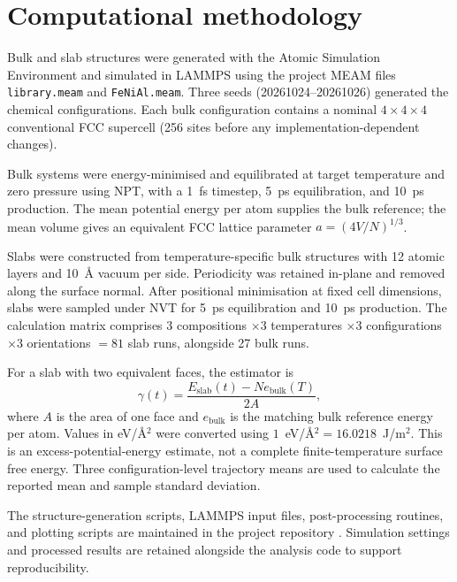 \section{Computational methodology}
Bulk and slab structures were generated with the Atomic Simulation Environment and simulated in LAMMPS using the project MEAM files \texttt{library.meam} and \texttt{FeNiAl.meam}. Three seeds (20261024--20261026) generated the chemical configurations. Each bulk configuration contains a nominal $4\times4\times4$ conventional FCC supercell (256 sites before any implementation-dependent changes).

\begin{figure}[t]
    \centering
    
\end{figure}

Bulk systems were energy-minimised and equilibrated at target temperature and zero pressure using NPT, with a 1~fs timestep, 5~ps equilibration, and 10~ps production. The mean potential energy per atom supplies the bulk reference; the mean volume gives an equivalent FCC lattice parameter $a=(4V/N)^{1/3}$.

Slabs were constructed from temperature-specific bulk structures with 12 atomic layers and 10~\AA{} vacuum per side. Periodicity was retained in-plane and removed along the surface normal. After positional minimisation at fixed cell dimensions, slabs were sampled under NVT for 5~ps equilibration and 10~ps production. The calculation matrix comprises $3$ compositions $\times3$ temperatures $\times3$ configurations $\times3$ orientations $=81$ slab runs, alongside 27 bulk runs.

For a slab with two equivalent faces, the estimator is
\begin{equation}
\gamma(t)=\frac{E_{\mathrm{slab}}(t)-N e_{\mathrm{bulk}}(T)}{2A},
\label{eq:gamma}
\end{equation}
where $A$ is the area of one face and $e_{\mathrm{bulk}}$ is the matching bulk reference energy per atom. Values in eV/\AA$^2$ were converted using $1$~eV/\AA$^2=16.0218$~J/m$^2$. This is an excess-potential-energy estimate, not a complete finite-temperature surface free energy. Three configuration-level trajectory means are used to calculate the reported mean and sample standard deviation.

The structure-generation scripts, LAMMPS input files, post-processing
routines, and plotting scripts are maintained in the project repository
\cite{project_repository}. Simulation settings and processed results
are retained alongside the analysis code to support reproducibility.
